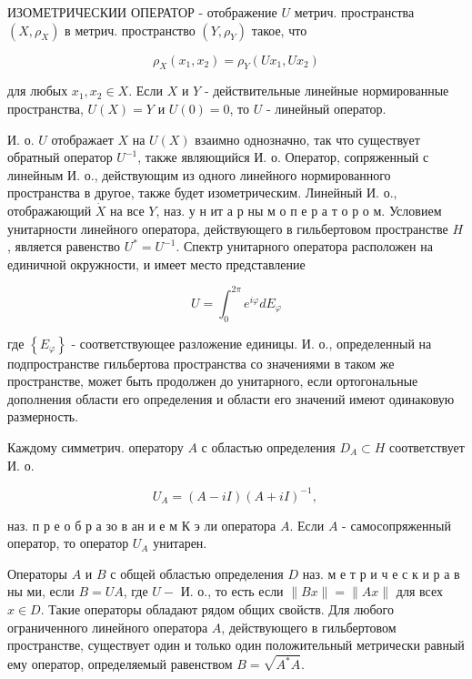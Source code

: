 \documentclass[10pt]{article}
\begin{document}
ИЗОМЕТРИЧЕСКИИ ОПЕРАТОР - отображение $U$ метрич. пространства $\left(X, \rho_{X}\right)$ в метрич. пространство $\left(Y, \rho_{Y}\right)$ такое, что



\[

\rho_{X}\left(x_{1}, x_{2}\right)=\rho_{Y}\left(U x_{1}, U x_{2}\right)

\]



для любых $x_{1}, x_{2} \in X$. Если $X$ и $Y$ - действительные линейные нормированные пространства, $U(X)=Y$ и $U(0)=0$, то $U$ - линейный оператор.



И. о. $U$ отображает $X$ на $U(X)$ взаимно однозначно, так что существует обратный оператор $U^{-1}$, также являющийся И. о. Оператор, сопряженный с линейным И. о., действующим из одного линейного нормированного пространства в другое, также будет изометрическим. Линейный И. о., отображающий $\dot{X}$ на все $Y$, наз. у н ит а р ны м о п е р а т о р о м. Условием унитарности линейного оператора, действующего в гильбертовом пространстве $H$, является равенство $U^{*}=U^{-1}$. Спектр унитарного оператора расположен на единичной окружности, и имеет место представление



\[

U=\int_{0}^{2 \pi} e^{i \varphi} d E_{\varphi}

\]



где $\left\{E_{\varphi}\right\}$ - соответствующее разложение единицы. И. о., определенный на подпространстве гильбертова пространства со значениями в таком же пространстве, может быть продолжен до унитарного, если ортогональные дополнения области его определения и области его значений имеют одинаковую размерность.



Каждому симметрич. оператору $A$ с областью определения $D_{A} \subset H$ соответствует И. о.



\[

U_{A}=(A-i I)(A+i I)^{-1} \text {, }

\]



наз. п р е о б р а зо в ан и е м К э ли оператора $A$. Если $A$ - самосопряженный оператор, то оператор $U_{A}$ унитарен.



Операторы $A$ и $B$ с общей областью определения $D$ наз. м е т р и ч е с к и р а в ны ми, если $B=U A$, где $U-$ И. о., то есть если $\|B x\|=\|A x\|$ для всех $x \in D$. Такие операторы обладают рядом общих свойств. Для любого ограниченного линейного оператора $A$, действующего в гильбертовом пространстве, существует один и только один положительный метрически равный ему оператор, определяемый равенством $B=\sqrt{A^{*} A}$.
\end{document}
